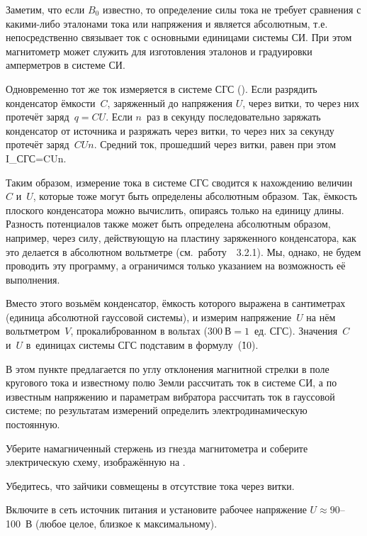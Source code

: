 Заметим, что если $B_0$ известно, то определение силы тока не требует сравнения с какими-либо эталонами тока или
напряжения и является абсолютным, т.е. непосредственно связывает ток с основными единицами системы СИ. При этом
магнитометр может служить для изготовления эталонов и градуировки амперметров в системе СИ.


Одновременно тот же ток измеряется в системе СГС (). Если разрядить конденсатор ёмкости~$C$, заряженный до напряжения
$U$, через витки, то через них протечёт заряд~$q=CU$. Если $n$~раз в секунду последовательно заряжать конденсатор от
источника и разряжать через витки, то через них за секунду протечёт заряд~$CUn$. Средний ток, прошедший через витки,
равен при этом
I_{СГС}=CUn.
\ee

Таким образом, измерение тока в системе СГС сводится к нахождению величин~$C$ и~$U$, которые тоже могут быть определены
абсолютным образом. Так, ёмкость плоского конденсатора можно вычислить, опираясь только на единицу длины. Разность
потенциалов также может быть определена абсолютным образом, например, через силу, действующую на пластину заряженного
конденсатора, как это делается в абсолютном вольтметре (см.~работу~\textnumero~3.2.1). Мы, однако, не будем проводить эту
программу, а ограничимся только указанием на возможность её выполнения.

Вместо этого возьмём конденсатор, ёмкость которого выражена в сантиметрах (единица абсолютной гауссовой системы), и
измерим напряжение~$U$ на нём вольтметром~$V$, прокалиброванном в вольтах ($300~В = 1$~ед. СГС). Значения~$C$ и~$U$
в~единицах системы СГС подставим в формулу~(\r{10}).

\zad

В этом пункте предлагается по углу отклонения магнитной стрелки в поле кругового тока и известному полю Земли рассчитать
ток в системе СИ, а по известным напряжению и параметрам вибратора рассчитать ток в гауссовой системе; по результатам
измерений определить электродинамическую постоянную.

\n Уберите намагниченный стержень из гнезда магнитометра и соберите электрическую схему, изображённую на .

\n Убедитесь, что зайчики совмещены в отсутствие тока через витки.

\n Включите в сеть источник питания и установите рабочее напряжение $U\approx 90$--100~В (любое целое, близкое к
максимальному).

